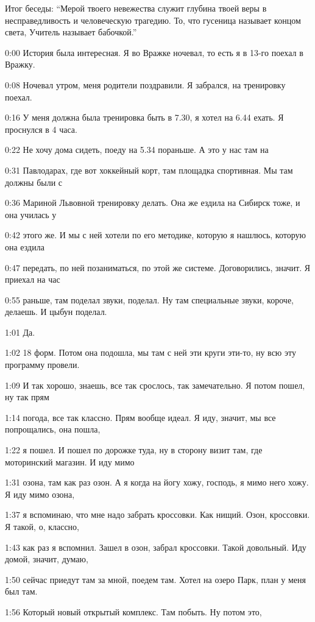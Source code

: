 

Итог беседы: ``Мерой твоего невежества служит глубина твоей веры в несправедливость
и человеческую трагедию. То, что гусеница называет концом света, Учитель
называет бабочкой.''

0:00
История была интересная. Я во Вражке ночевал, то есть я в 13-го поехал в Вражку.

0:08
Ночевал утром, меня родители поздравили. Я забрался, на тренировку поехал.

0:16
У меня должна была тренировка быть в 7.30, я хотел на 6.44 ехать. Я проснулся в 4 часа.

0:22
Не хочу дома сидеть, поеду на 5.34 пораньше. А это у нас там на

0:31
Павлодарах, где вот хоккейный корт, там площадка спортивная. Мы там должны были с

0:36
Мариной Львовной тренировку делать. Она же ездила на Сибирск тоже, и она училась у

0:42
этого же. И мы с ней хотели по его методике, которую я нашлюсь, которую она ездила

0:47
передать, по ней позаниматься, по этой же системе. Договорились, значит. Я приехал на час

0:55
раньше, там поделал звуки, поделал. Ну там специальные звуки, короче, делаешь. И цыбун поделал.

1:01
Да.

1:02
18 форм. Потом она подошла, мы там с ней эти круги эти-то, ну всю эту программу провели.

1:09
И так хорошо, знаешь, все так срослось, так замечательно. Я потом пошел, ну так прям

1:14
погода, все так классно. Прям вообще идеал. Я иду, значит, мы все попрощались, она пошла,

1:22
я пошел. И пошел по дорожке туда, ну в сторону визит там, где моторинский магазин. И иду мимо

1:31
озона, там как раз озон. А я когда на йогу хожу, господь, я мимо него хожу. Я иду мимо озона,

1:37
я вспоминаю, что мне надо забрать кроссовки. Как нищий. Озон, кроссовки. Я такой, о, классно,

1:43
как раз я вспомнил. Зашел в озон, забрал кроссовки. Такой довольный. Иду домой, значит, думаю,

1:50
сейчас приедут там за мной, поедем там. Хотел на озеро Парк, план у меня был там.

1:56
Который новый открытый комплекс. Там побыть. Ну потом это,

